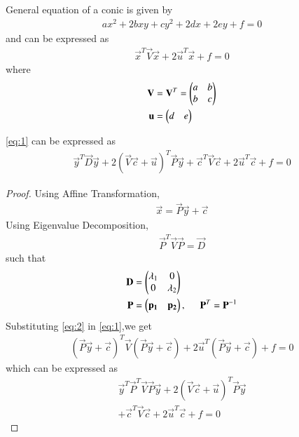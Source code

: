 \documentclass[journal,12pt,twocolumn]{IEEEtran}
\begin{document}
\clearpage
\begin{theorem}
General equation of a conic is given by
\begin{align}
ax^2+2bxy+cy^2+2dx+2ey+f=0 \label{eq:15}
\end{align}
and can be expressed as 
\begin{align}
    \vec{x}^T\vec{V}\vec{x} + 2\vec{u}^T\vec{x} + f = 0 \label{eq:1}
\end{align}
where
\begin{align}
    \mathbf{V}&=\mathbf{V}^T=\begin{pmatrix}a & b\\b & c\end{pmatrix}
    \\
    \mathbf{u}&=\begin{pmatrix}d & e\end{pmatrix}
\end{align}
\end{theorem}
\begin{theorem}
\eqref{eq:1} can be expressed as 
\begin{align}
    \vec{y}^T\vec{D}\vec{y} + 2(\vec{V}\vec{c} + \vec{u})^T \vec{P}\vec{y} + \vec{c}^T\vec{V}\vec{c} + 2\vec{u}^T\vec{c} + f = 0 \label{eq:22}
\end{align}
\end{theorem}
\begin{proof}
Using Affine Transformation,
\begin{align}
    \vec{x}=\vec{P}\vec{y}+\vec{c} \label{eq:2}
\end{align}
Using Eigenvalue Decomposition,
\begin{align}
    \vec{P}^T\vec{V}\vec{P}=\vec{D} \label{eq:4}
\end{align}
such that
\begin{align}
    \mathbf{D} &= \begin{pmatrix}\lambda_1 & 0 \\ 0 & \lambda_2\end{pmatrix}
    \\
    \mathbf{P} &= \begin{pmatrix}\mathbf{p_1} & \mathbf{p_2}\end{pmatrix},\hspace{0.5cm}
    \mathbf{P}^T = \mathbf{P}^{-1} \label{eq:5}
\end{align}
Substituting \eqref{eq:2} in \eqref{eq:1},we get
\begin{align}
    (\vec{P}\vec{y}+\vec{c})^T\vec{V}(\vec{P}\vec{y}+\vec{c}) + 2\vec{u}^T(\vec{P}\vec{y}+\vec{c}) + f = 0
\end{align}
which can be expressed as
\begin{multline}
\vec{y}^T\vec{P}^T\vec{V}\vec{P}\vec{y} + 2(\vec{V}\vec{c} + \vec{u})^T \vec{P}\vec{y}\\
+ \vec{c}^T\vec{V}\vec{c} + 2\vec{u}^T\vec{c} + f = 0 \label{eq:3}
\end{multline}
\end{proof}
\end{document}
